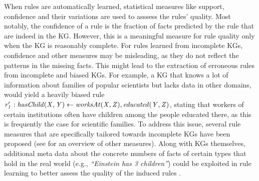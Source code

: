 When rules are automatically learned, statistical measures like support, confidence and their variations are used to asssess the rules' quality. Most notably, the confidence of a rule is the fraction of facts predicted by the rule that are indeed in the KG. However, this is a meaningful measure for rule quality only when the KG is reasonably complete. For rules learned from incomplete KGs, confidence and other measures may be misleading, as they do not reflect the patterns in the missing facts. This might lead to the extraction of erroneous rules from incomplete and biased KGs. For example, a KG that knows a lot of information about families of popular scientists but lacks data in other domains, would yield a heavily biased rule $\mathit{r_1':hasChild(X,Y)\leftarrow worksAt(X,Z), educated(Y,Z)}$, stating that workers of certain institutions often have children among the people educated there, as this is frequently the case for scientific families. To address this issue, several rule measures that are specifically tailored towards incomplete KGs have been proposed \cite{amie,DBLP:conf/www/ZupancD18} (see \cite{metrics-summary,Azevedo2007} for an overview of other measures). Along with KGs themselves, additional meta data about the concrete numbers of facts of certain types that hold in the real world (e.g., \emph{``Einstein has 3 children''}) could be exploited in rule learning to better assess the quality of the induced rules \cite{carl}. 

